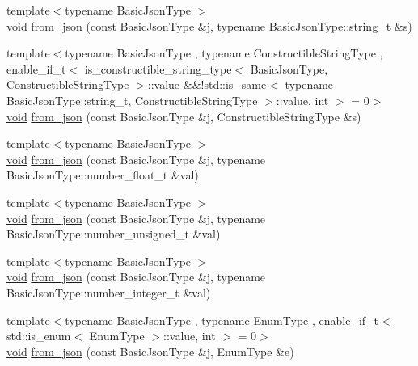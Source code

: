\begin{DoxyCompactItemize}
\item 
{\footnotesize template$<$typename Basic\+Json\+Type $>$ }\\\hyperlink{namespacenlohmann_1_1detail_a59fca69799f6b9e366710cb9043aa77d}{void} \hyperlink{namespacenlohmann_1_1detail_ad74d89f77ada7a57eff38b43d4bf2335}{from\+\_\+json} (const Basic\+Json\+Type \&j, typename Basic\+Json\+Type\+::string\+\_\+t \&s)
\item 
{\footnotesize template$<$typename Basic\+Json\+Type , typename Constructible\+String\+Type , enable\+\_\+if\+\_\+t$<$ is\+\_\+constructible\+\_\+string\+\_\+type$<$ Basic\+Json\+Type, Constructible\+String\+Type $>$\+::value \&\&!std\+::is\+\_\+same$<$ typename Basic\+Json\+Type\+::string\+\_\+t, Constructible\+String\+Type $>$\+::value, int $>$  = 0$>$ }\\\hyperlink{namespacenlohmann_1_1detail_a59fca69799f6b9e366710cb9043aa77d}{void} \hyperlink{namespacenlohmann_1_1detail_a2932f2bc2943dac6d51669312f4fc0f5}{from\+\_\+json} (const Basic\+Json\+Type \&j, Constructible\+String\+Type \&s)
\item 
{\footnotesize template$<$typename Basic\+Json\+Type $>$ }\\\hyperlink{namespacenlohmann_1_1detail_a59fca69799f6b9e366710cb9043aa77d}{void} \hyperlink{namespacenlohmann_1_1detail_a7cb5dd7d46a60e65f9a8e0873b3f7dd8}{from\+\_\+json} (const Basic\+Json\+Type \&j, typename Basic\+Json\+Type\+::number\+\_\+float\+\_\+t \&val)
\item 
{\footnotesize template$<$typename Basic\+Json\+Type $>$ }\\\hyperlink{namespacenlohmann_1_1detail_a59fca69799f6b9e366710cb9043aa77d}{void} \hyperlink{namespacenlohmann_1_1detail_ace4d5680ba413d9fd897ccb5d9c61a1c}{from\+\_\+json} (const Basic\+Json\+Type \&j, typename Basic\+Json\+Type\+::number\+\_\+unsigned\+\_\+t \&val)
\item 
{\footnotesize template$<$typename Basic\+Json\+Type $>$ }\\\hyperlink{namespacenlohmann_1_1detail_a59fca69799f6b9e366710cb9043aa77d}{void} \hyperlink{namespacenlohmann_1_1detail_a047d881e611fcac709dc318f730a1732}{from\+\_\+json} (const Basic\+Json\+Type \&j, typename Basic\+Json\+Type\+::number\+\_\+integer\+\_\+t \&val)
\item 
{\footnotesize template$<$typename Basic\+Json\+Type , typename Enum\+Type , enable\+\_\+if\+\_\+t$<$ std\+::is\+\_\+enum$<$ Enum\+Type $>$\+::value, int $>$  = 0$>$ }\\\hyperlink{namespacenlohmann_1_1detail_a59fca69799f6b9e366710cb9043aa77d}{void} \hyperlink{namespacenlohmann_1_1detail_a5440d650150d01e8015133521351b459}{from\+\_\+json} (const Basic\+Json\+Type \&j, Enum\+Type \&e)

\end{DoxyCompactItemize}
